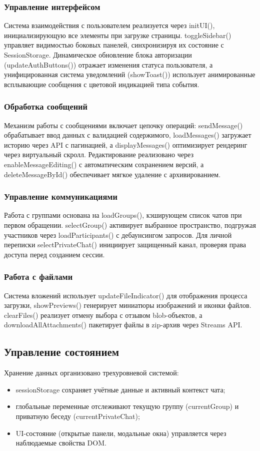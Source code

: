 \subsubsection{Управление интерфейсом}
Система взаимодействия с пользователем реализуется через initUI(), инициализирующую все элементы при загрузке страницы. toggleSidebar() управляет видимостью боковых панелей, синхронизируя их состояние с SessionStorage. Динамическое обновление блока авторизации (updateAuthButtons()) отражает изменения статуса пользователя, а унифицированная система уведомлений (showToast()) использует анимированные всплывающие сообщения с цветовой индикацией типа события.

\subsubsection{Обработка сообщений}
Механизм работы с сообщениями включает цепочку операций: sendMessage() обрабатывает ввод данных с валидацией содержимого, loadMessages() загружает историю через API с пагинацией, а displayMessages() оптимизирует рендеринг через виртуальный скролл. Редактирование реализовано через enableMessageEditing() с автоматическим сохранением версий, а deleteMessageById() обеспечивает мягкое удаление с архивированием.

\subsubsection{Управление коммуникациями}
	Работа с группами основана на loadGroups(), кэширующем список чатов при первом обращении. selectGroup() активирует выбранное пространство, подгружая участников через loadParticipants() с дебаунсингом запросов. Для личной переписки selectPrivateChat() инициирует защищенный канал, проверяя права доступа перед созданием сессии.
	
	\subsubsection{Работа с файлами}
		Система вложений использует updateFileIndicator() для отображения процесса загрузки, showPreviews() генерирует миниатюры изображений и иконки файлов. clearFiles() реализует отмену выбора с отзывом blob-объектов, а downloadAllAttachments() пакетирует файлы в zip-архив через Streams API.
		
		\subsection{Управление состоянием}  
		Хранение данных организовано трехуровневой системой:  
		\begin{itemize}  
			\item sessionStorage сохраняет учётные данные и активный контекст чата;  
			\item глобальные переменные отслеживают текущую группу (currentGroup) и приватную беседу (currentPrivateChat);  
			\item UI-состояние (открытые панели, модальные окна) управляется через наблюдаемые свойства DOM.  
		\end{itemize}  
		
